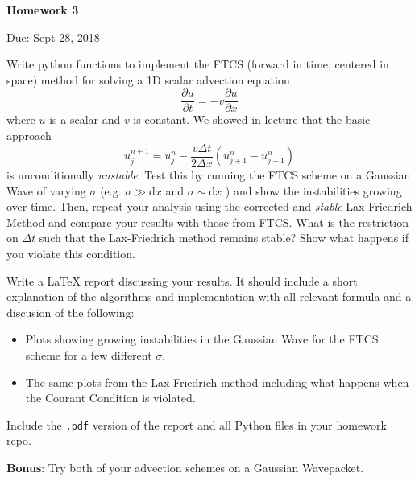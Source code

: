 \documentclass{article}
\begin{document}
\begin{center}

\vspace*{-2.5cm}
\LARGE
\bf{Homework 3}
\vspace{1cm}

\large{Due: Sept 28, 2018}
\vspace{1cm}

\end{center}

Write python functions to implement the FTCS (forward in time, centered in space) method for solving a 1D scalar advection equation
\begin{equation*}
   \frac{\partial u}{\partial t} = -v \frac{\partial u}{\partial x}
\end{equation*}
where $u$ is a scalar and $v$ is constant. We showed in lecture that the basic approach
\begin{equation*}
   u_j^{n+1} = u^n_j - \frac{v \Delta t}{2\Delta x} \left( u^n_{j+1} - u^n_{j-1} \right) 
\end{equation*}
is unconditionally \emph{unstable}. Test this by running the FTCS scheme on a Gaussian Wave of varying $\sigma$ (e.g. $\sigma \gg \mathrm{d}x$ and $\sigma \sim \mathrm{d}x$ ) and show the instabilities growing over time.  Then, repeat your analysis using the corrected and \emph{stable} Lax-Friedrich Method and compare your results with those from FTCS.  What is the restriction on $\Delta t$ such that the Lax-Friedrich method remains stable?  Show what happens if you violate this condition.
\par
Write a \LaTeX{} report discussing your results.  It should include a short explanation of the algorithms and implementation with all relevant formula and a discusion of the following:
\begin{itemize}
   \item Plots showing growing instabilities in the Gaussian Wave for the FTCS scheme for a few different $\sigma$.
   \item The same plots from the Lax-Friedrich method including what happens when the Courant Condition is violated.
\end{itemize}
Include the \texttt{.pdf} version of the report and all Python files in your homework repo.
\par
\vspace{1cm}
\textbf{Bonus}: Try both of your advection schemes on a Gaussian Wavepacket.
\end{document}
